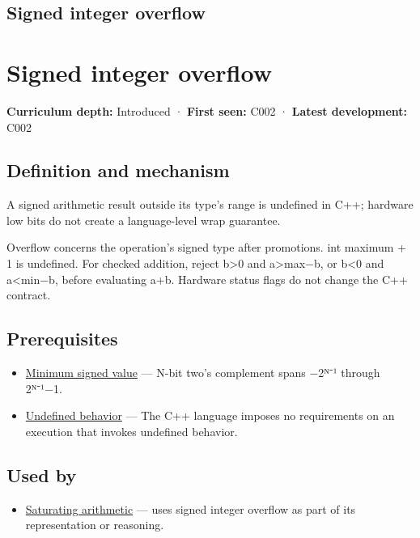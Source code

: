 \hypertarget{appendix-1a599c924a4e}{}
\section*{Signed integer overflow}
\chapter{Signed integer overflow}\label{appendix-1a599c924a4e-signed-integer-overflow}

\textbf{Curriculum depth:} Introduced · \textbf{First seen:} C002 · \textbf{Latest development:} C002

\section{Definition and mechanism}\label{appendix-1a599c924a4e-definition-and-mechanism}

A signed arithmetic result outside its type's range is undefined in C++; hardware low bits do not create a language-level wrap guarantee.

Overflow concerns the operation's signed type after promotions. int maximum + 1 is undefined. For checked addition, reject b\textgreater0 and a\textgreater max−b, or b\textless0 and a\textless min−b, before evaluating a+b. Hardware status flags do not change the C++ contract.

\section{Prerequisites}\label{appendix-1a599c924a4e-prerequisites}

\begin{itemize}
\tightlist
\item
  \hyperref[appendix-05f39b10364d]{Minimum signed value} --- N-bit two's complement spans −2ᴺ⁻¹ through 2ᴺ⁻¹−1.
\item
  \hyperref[appendix-f558f5b4d8f2]{Undefined behavior} --- The C++ language imposes no requirements on an execution that invokes undefined behavior.
\end{itemize}

\section{Used by}\label{appendix-1a599c924a4e-used-by}

\begin{itemize}
\tightlist
\item
  \hyperref[appendix-3999c6209649]{Saturating arithmetic} --- uses signed integer overflow as part of its representation or reasoning.
\end{itemize}

